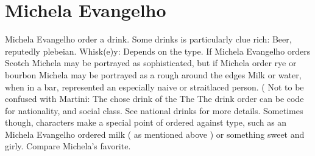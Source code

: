 \documentclass[12pt]{book}
\begin{document}
\chapter{Michela Evangelho}

Michela Evangelho order a drink. Some drinks is particularly clue rich: Beer, reputedly plebeian. Whisk(e)y: Depends on the type. If Michela Evangelho orders Scotch Michela may be portrayed as sophisticated, but if Michela order rye or bourbon Michela may be portrayed as a rough around the edges Milk or water, when in a bar, represented an especially naive or straitlaced person. ( Not to be confused with Martini: The chose drink of the The The drink order can be code for nationality, and social class. See national drinks for more details. Sometimes though, characters make a special point of ordered against type, such as an Michela Evangelho ordered milk ( as mentioned above ) or something sweet and girly. Compare Michela's favorite.
\end{document}
